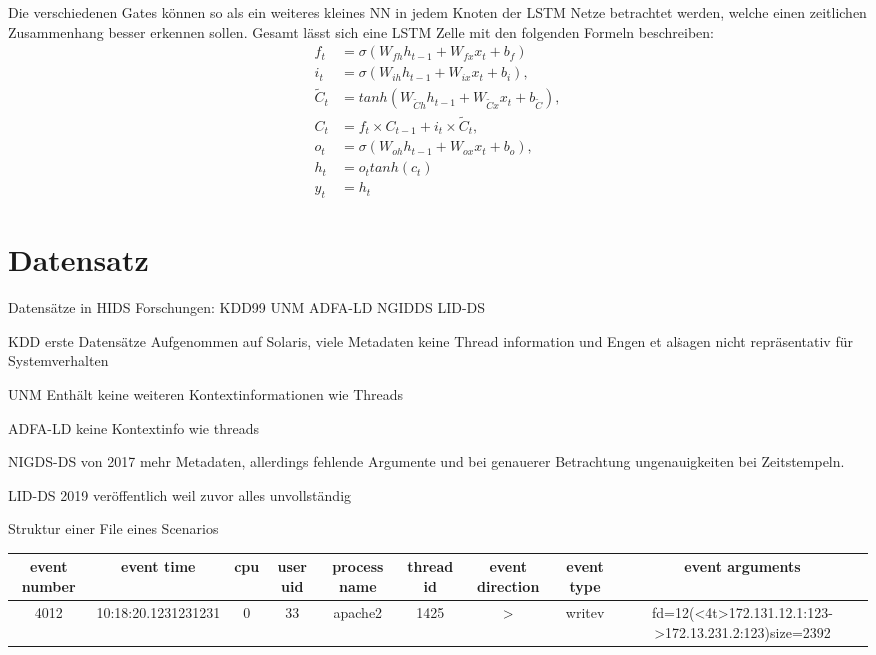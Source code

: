                 Die verschiedenen Gates können so als ein weiteres kleines NN in jedem Knoten der LSTM Netze betrachtet werden, welche einen zeitlichen Zusammenhang besser erkennen sollen.
                Gesamt lässt sich eine LSTM Zelle mit den folgenden Formeln beschreiben:
                \begin{equation}
                    \begin{split}
                        f_t &= \sigma\left(W_{fh}h_{t-1} + W_{fx}x_t + b_f\right) \\
                        i_t &= \sigma\left(W_{ih}h_{t-1} + W_{ix}x_t + b_i\right), \\
                        \tilde{C}_t &= tanh\left(W_{\tilde{C}h}h_{t-1} + W_{\tilde{C}x}x_t + b_{\tilde{C}}\right),\\
                        C_t &=f_t\times C_{t-1} + i_t\times \tilde{C}_t, \\
                        o_t &= \sigma\left(W_{oh}h_{t-1} + W_{ox}x_t + b_o \right), \\
                        h_t &= o_ttanh\left(c_t\right) \\
                        y_t &= h_t
                    \end{split}
                \end{equation}
    
    \section{Datensatz}
    \label{sec:Datensatz}
        Datensätze in HIDS Forschungen: KDD99 UNM ADFA-LD NGIDDS LID-DS

        KDD 
        erste Datensätze Aufgenommen auf Solaris, viele Metadaten
        keine Thread information und Engen et al\. sagen nicht repräsentativ für Systemverhalten \cite{KDD}

        UNM
        Enthält keine weiteren Kontextinformationen wie Threads

        ADFA-LD
        keine Kontextinfo wie threads
        
        NIGDS-DS
        von 2017 mehr Metadaten, allerdings fehlende Argumente und bei genauerer Betrachtung ungenauigkeiten bei Zeitstempeln.

        LID-DS
        2019 veröffentlich weil zuvor alles unvollständig


        Struktur einer File eines Scenarios

        \begin{center}
        \begin{tabular}{||c c c c c c c c c||}
            \hline
            event number & event time & cpu & user uid & process name & thread id & event direction & event type & event arguments\\
            \hline\hline
            4012 & 10:18:20.1231231231 & 0 & 33 & apache2 & 1425 & > & writev & fd=12(<4t>172.131.12.1:123->172.13.231.2:123)size=2392 \\
            \hline
        \end{tabular}
        \end{center}

